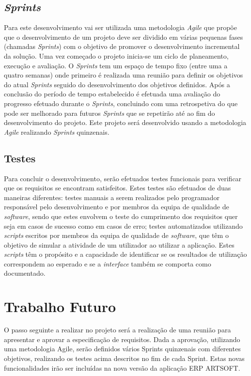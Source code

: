 \documentclass[sigplan]{acmart}
\begin{document}
\subsection{\textit{Sprints}}

Para este desenvolvimento vai ser utilizada uma metodologia \textit{Agile} que propõe que o desenvolvimento de um projeto deve ser dividido em várias pequenas fases (chamadas \textit{Sprints}) com o objetivo de promover o desenvolvimento incremental da solução. Uma vez começado o projeto inicia-se um ciclo de planeamento, execução e avaliação. O \textit{Sprints} tem um espaço de tempo fixo (entre uma a quatro semanas) onde primeiro é realizada uma reunião para definir os objetivos do atual \textit{Sprints} seguido do desenvolvimento dos objetivos definidos. Após a conclusão do período de tempo estabelecido é efetuada uma avaliação do progresso efetuado durante o \textit{Sprints}, concluindo com uma retrospetiva do que pode ser melhorado para futuros \textit{Sprints} que se repetirão até ao fim do desenvolvimento do projeto. Este projeto será desenvolvido usando a metodologia \textit{Agile} realizando \textit{Sprints} quinzenais.

\subsection{Testes}

Para concluir o desenvolvimento, serão efetuados testes funcionais para verificar que os requisitos se encontram satisfeitos. Estes testes são efetuados de duas maneiras diferentes: testes manuais a serem realizados pelo programador responsável pelo desenvolvimento e por membros da equipa de qualidade de \textit{software}, sendo que estes envolvem o teste do cumprimento dos requisitos quer seja em casos de sucesso como em casos de erro; testes automatizados utilizando \textit{scripts} escritos por membros da equipa de qualidade de \textit{software}, que têm o objetivo de simular a atividade de um utilizador ao utilizar a aplicação. Estes \textit{scripts} têm o propósito e a capacidade de identificar se os resultados de utilização correspondem ao esperado e se a \textit{interface} também se comporta como documentado.

\section{Trabalho Futuro} \label{sec:forthcomingwork}

O passo seguinte a realizar no projeto será a realização de uma reunião para apresentar e aprovar a especificação de requisitos. Dada a aprovação, utilizando uma metodologia Agile, serão definidos vários Sprints quinzenais com diferentes objetivos, realizando os testes acima descritos no fim de cada Sprint. Estas novas funcionalidades irão ser incluídas na nova versão da aplicação ERP ARTSOFT.



\end{document}
